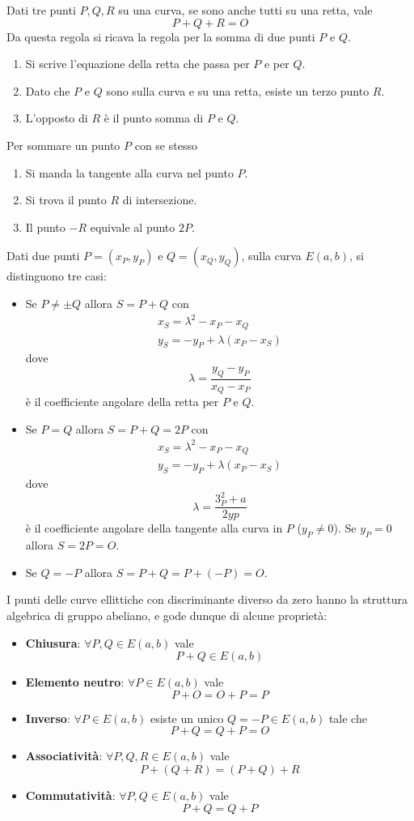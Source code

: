 Dati tre punti $P, Q, R$ su una curva, se sono anche tutti su una retta, vale
\[ P + Q + R = O \]
Da questa regola si ricava la regola per la somma di due punti $P$ e $Q$.
\begin{enumerate}
	\item Si scrive l'equazione della retta che passa per $P$ e per $Q$.
	\item Dato che $P$ e $Q$ sono sulla curva e su una retta, esiste un terzo punto $R$.
	\item L'opposto di $R$ \`e il punto somma di $P$ e $Q$.
\end{enumerate}
Per sommare un punto $P$ con se stesso
\begin{enumerate}
	\item Si manda la tangente alla curva nel punto $P$.
	\item Si trova il punto $R$ di intersezione.
	\item Il punto $-R$ equivale al punto $2P$.
\end{enumerate}
Dati due punti $P = (x_P, y_P)$ e $Q = (x_Q, y_Q)$, sulla curva $E(a, b)$, si distinguono tre casi:
\begin{itemize}
	\item Se $P \neq \pm Q$ allora $S = P + Q$ con
	      \[ \begin{matrix}
			      x_S = \lambda^2 - x_P - x_Q \\
			      y_S = -y_P + \lambda (x_P - x_S)
		      \end{matrix}
	      \]
	      dove
	      \[ \lambda = \frac{y_Q - y_P}{x_Q - x_P} \]
	      \`e il coefficiente angolare della retta per $P$ e $Q$.
	\item Se $P = Q$ allora $S = P + Q = 2P$ con
	      \[
		      \begin{matrix}
			      x_S = \lambda^2 - x_P - x_Q \\
			      y_S = -y_P + \lambda (x_P - x_S)
		      \end{matrix}
	      \]
	      dove
	      \[ \lambda = \frac{3_P^2 + a}{2yp} \]
	      \`e il coefficiente angolare della tangente alla curva in $P$ ($y_P \neq 0$).
	      Se $y_P = 0$ allora $S = 2P = O$.
	\item Se $Q = -P$ allora $S = P + Q = P + (-P) = O$.
\end{itemize}
I punti delle curve ellittiche con discriminante diverso da zero hanno la struttura algebrica di gruppo abeliano,
e gode dunque di alcune propriet\`a:
\begin{itemize}
	\item \textbf{Chiusura}: $\forall P, Q \in E(a, b)$ vale
	      \[ P + Q \in E(a, b) \]
	\item \textbf{Elemento neutro}: $\forall P \in E(a, b)$ vale
	      \[ P + O = O + P = P \]
	\item \textbf{Inverso}: $\forall P \in E(a, b)$ esiste un unico $Q = -P \in E(a, b)$ tale che
	      \[ P + Q = Q + P = O \]
	\item \textbf{Associativit\`a}: $\forall P, Q, R \in E(a, b)$ vale
	      \[ P + (Q + R) = (P + Q) + R \]
	\item \textbf{Commutativit\`a}: $\forall P, Q \in E(a, b)$ vale
	      \[ P + Q = Q + P \]
\end{itemize}

